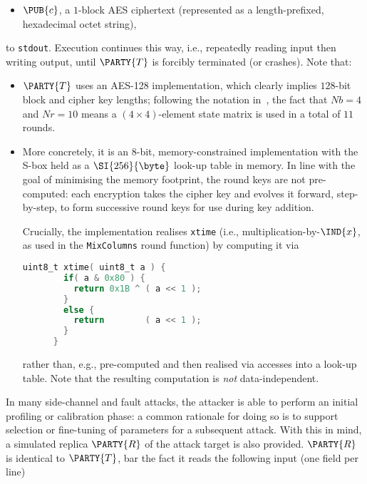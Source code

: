 \begin{itemize}
\item $\PUB{c}$,
      a  ${1}$-block AES ciphertext
      (represented as a  length-prefixed, hexadecimal octet   string),
\end{itemize}

\noindent
to   \lstinline[language={bash}]{stdout}.
Execution continues this way, i.e., repeatedly reading input then writing 
output, until $\PARTY{T}$ is forcibly terminated (or crashes).
Note that:

\begin{itemize}
\item $\PARTY{T}$ uses an AES-128 implementation,
      which clearly implies $128$-bit block and cipher key lengths;
      following the notation in~\cite[Figure 5]{SCALE:FIPS:197:01}, the 
      fact that 
      $
      Nb =  4
      $ 
      and 
      $
      Nr = 10
      $ 
      means a $( 4 \times 4 )$-element state matrix is used in a total of 
      $11$ rounds.
\item More concretely, it is an $8$-bit, memory-constrained implementation
      with the S-box held as a $\SI{256}{\byte}$ look-up table in memory. 
      In line with the goal of minimising the memory footprint, the round
      keys are not pre-computed: each encryption takes the cipher key and
      evolves it forward, step-by-step, to form successive round keys for
      use during key addition.  

      Crucially, the implementation realises 
      \lstinline[language={C}]|xtime| (i.e., multiplication-by-$\IND{x}$,
      as used in the \lstinline{MixColumns} round function) by computing
      it via

      \begin{lstlisting}[language={C},gobble={6},frame={single},basicstyle={\ttfamily\small}]
      uint8_t xtime( uint8_t a ) {
        if( a & 0x80 ) {
          return 0x1B ^ ( a << 1 );
        }
        else {
          return        ( a << 1 );
        }
      }
      \end{lstlisting}

      \noindent
      rather than, e.g., pre-computed and then realised via accesses into 
      a look-up table.  Note that the resulting computation is {\em not} 
      data-independent.
\end{itemize}


In many side-channel and fault attacks, the attacker is able to perform an 
initial profiling or calibration phase: a common rationale for doing so is 
to support selection or fine-tuning of parameters for a subsequent attack.  
With this in mind, a simulated replica $\PARTY{R}$ of the attack target is 
also provided.
$\PARTY{R}$ is identical to $\PARTY{T}$, bar the fact it
 reads the following  input (one field per line)

